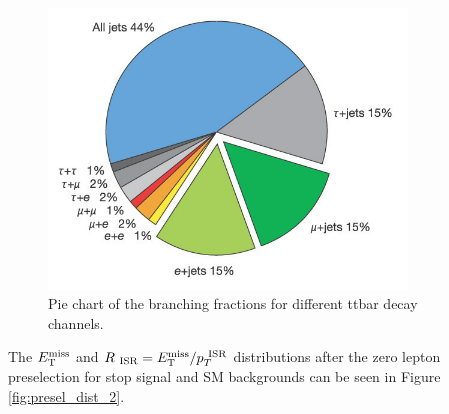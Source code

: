 \begin{figure}[h!]
  \begin{center}
    	\includegraphics[width=0.85\textwidth]{figures/strategy/ttbarDecay.jpg}\hspace{0.05\textwidth}
   \end{center}
\caption{ Pie chart of the branching fractions for different ttbar decay channels. }
\label{fig:ttbardecay} 
\end{figure}

\indent The $E_{\mathrm{T}}^{\mathrm{miss}}$ and $R_{~\mathrm{ISR}} = E_{\mathrm{T}}^{\mathrm{miss}}/p_{T}^{~\mathrm{ISR}}$ distributions after the zero lepton preselection for stop signal and SM backgrounds can be seen in Figure \ref{fig:presel_dist_2}.  \\

